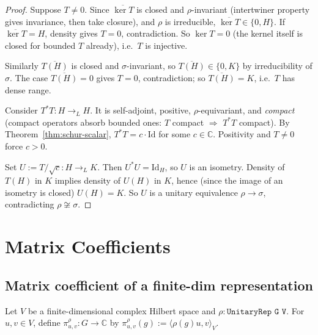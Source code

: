 \begin{proof}
  Suppose $T \neq 0$. Since $\overline{\ker T}$ is closed and
  $\rho$-invariant (intertwiner property gives invariance, then take
  closure), and $\rho$ is irreducible, $\overline{\ker T} \in
  \{0, H\}$. If $\overline{\ker T} = H$, density gives $T = 0$,
  contradiction. So $\ker T = 0$ (the kernel itself is closed for
  bounded $T$ already), i.e.\ $T$ is injective.

  Similarly $\overline{T(H)}$ is closed and $\sigma$-invariant, so
  $\overline{T(H)} \in \{0, K\}$ by irreducibility of $\sigma$. The case
  $\overline{T(H)} = 0$ gives $T = 0$, contradiction; so
  $\overline{T(H)} = K$, i.e.\ $T$ has dense range.

  Consider $T^* T : H \to_L H$. It is self-adjoint, positive,
  $\rho$-equivariant, and \emph{compact} (compact operators absorb
  bounded ones: $T$ compact $\Rightarrow$ $T^*T$ compact). By
  Theorem~\ref{thm:schur-scalar}, $T^* T = c \cdot \mathrm{Id}$ for
  some $c \in \mathbb C$. Positivity and $T \neq 0$ force $c > 0$.

  Set $U := T / \sqrt c : H \to_L K$. Then $U^* U = \mathrm{Id}_H$, so
  $U$ is an isometry. Density of $T(H)$ in $K$ implies density of
  $U(H)$ in $K$, hence (since the image of an isometry is closed)
  $U(H) = K$. So $U$ is a unitary equivalence
  $\rho \to \sigma$, contradicting $\rho \not\cong \sigma$.
\end{proof}


\chapter{Matrix Coefficients}
\label{chap:matCoeff}

\section{Matrix coefficient of a finite-dim representation}

\begin{definition}
  \label{def:matrixCoeff}
  \leanok
  Let $V$ be a finite-dimensional complex Hilbert space and
  $\rho : \texttt{UnitaryRep G V}$. For $u, v \in V$, define
  $\pi_{u,v}^\rho : G \to \mathbb C$ by
  $\pi_{u,v}^\rho(g) := \langle \rho(g) u, v\rangle_V$.
\end{definition}

